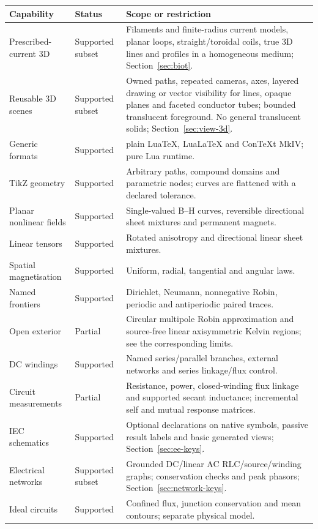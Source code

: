 \begin{longtable}{p{.24\linewidth}p{.13\linewidth}p{.53\linewidth}}
\toprule Capability & Status & Scope or restriction\\
\midrule\endhead
Prescribed-current 3D & Supported subset & Filaments and finite-radius current models, planar loops, straight/toroidal coils, true 3D lines and profiles in a homogeneous medium; Section~\ref{sec:biot}.\\
Reusable 3D scenes & Supported subset & Owned paths, repeated cameras, axes, layered drawing or vector visibility for lines, opaque planes and faceted conductor tubes; bounded translucent foreground. No general translucent solids; Section~\ref{sec:view-3d}.\\
Generic formats & Supported & plain LuaTeX, LuaLaTeX and ConTeXt MkIV; pure Lua runtime.\\
TikZ geometry & Supported & Arbitrary paths, compound domains and parametric nodes; curves are flattened with a declared tolerance.\\
Planar nonlinear fields & Supported & Single-valued B--H curves, reversible directional sheet mixtures and permanent magnets.\\
Linear tensors & Supported & Rotated anisotropy and directional linear sheet mixtures.\\
Spatial magnetisation & Supported & Uniform, radial, tangential and angular laws.\\
Named frontiers & Supported & Dirichlet, Neumann, nonnegative Robin, periodic and antiperiodic paired traces.\\
Open exterior & Partial & Circular multipole Robin approximation and source-free linear axisymmetric Kelvin regions; see the corresponding limits.\\
DC windings & Supported & Named series/parallel branches, external networks and series linkage/flux control.\\
Circuit measurements & Partial & Resistance, power, closed-winding flux linkage and supported secant inductance; incremental self and mutual response matrices.\\
IEC schematics & Supported & Optional declarations on native symbols, passive result labels and basic generated views; Section~\ref{sec:ee-keys}.\\
Electrical networks & Supported subset & Grounded DC/linear AC RLC/source/winding graphs; conservation checks and peak phasors; Section~\ref{sec:network-keys}.\\
Ideal circuits & Supported & Confined flux, junction conservation and mean contours; separate physical model.\\

\end{longtable}
